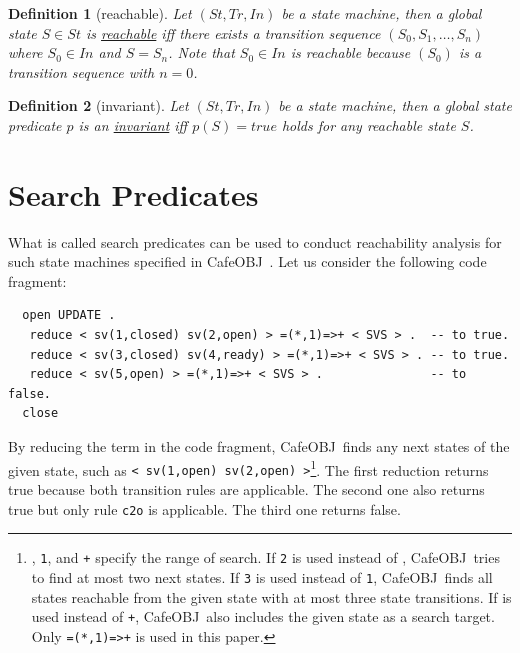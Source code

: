 \documentclass[12pt]{report}
\newtheorem{definition}{Definition}
\newcommand{\stt}[1]{{\small{\tt {#1}}}}
\newcommand{\ul}{\underline}
\newcommand{\cafeobj}{{\sf CafeOBJ}~}
\begin{document}
\begin{definition}[reachable]
  Let $(St,Tr,In)$ be a state machine, then a global state $S\in St$
  is \ul{reachable} iff there exists a transition sequence
  $(S_0,S_1,\dots,S_n)$ where $S_0\in In$ and $S=S_n$. Note that $S_0\in
  In$ is reachable because $(S_0)$ is a transition sequence with $n=0$.
\end{definition}
\begin{definition}[invariant]
  Let $(St,Tr,In)$ be a state machine, then a global state predicate
  $p$ is an \ul{invariant} iff $p(S)=true$ holds for any reachable
  state $S$.
\end{definition}

\section{Search Predicates}
\label{sec:searchpredicate}
What is called search predicates can be used to conduct
reachability analysis for such state machines specified in
\cafeobj. Let us consider the following code fragment:
\small
\begin{verbatim}
  open UPDATE .
   reduce < sv(1,closed) sv(2,open) > =(*,1)=>+ < SVS > .  -- to true.
   reduce < sv(3,closed) sv(4,ready) > =(*,1)=>+ < SVS > . -- to true.
   reduce < sv(5,open) > =(*,1)=>+ < SVS > .               -- to false.
  close
\end{verbatim}
\normalsize
By reducing the term in the code fragment, \cafeobj finds any next
states of the given state, such as
\stt{<~sv(1,open)~sv(2,open)~>}\footnote{{\tt *}, {\tt 1}, and {\tt +}
  specify the range of search. If {\tt 2} is used instead of {\tt *},
  \cafeobj tries to find at most two next states. If {\tt 3} is used
  instead of {\tt 1}, \cafeobj finds all states reachable from the
  given state with at most three state transitions. If {\tt *} is used
  instead of {\tt +}, \cafeobj also includes the given state as a
  search target.  Only \stt{=(*,1)=>+} is used in this paper.}.  The
first reduction returns true because both transition rules are
applicable.  The second one also returns true but only rule {\tt c2o}
is applicable. The third one returns false.
\end{document}
